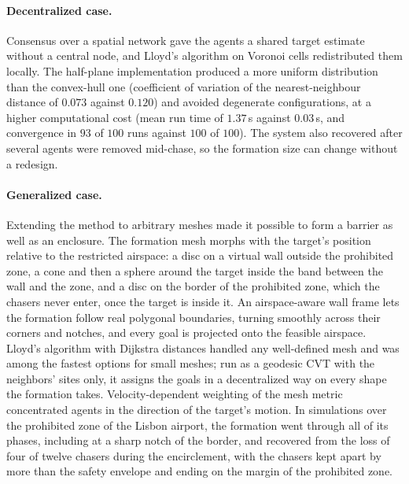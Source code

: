 \paragraph{Decentralized case.} 
Consensus over a spatial network gave the agents a shared target estimate without a central node, and Lloyd's algorithm on Voronoi cells redistributed them locally. The half-plane implementation produced a more uniform distribution than the convex-hull one (coefficient of variation of the nearest-neighbour distance of $0.073$ against $0.120$) and avoided degenerate configurations, at a higher computational cost (mean run time of $1.37$\,s against $0.03$\,s, and convergence in $93$ of $100$ runs against $100$ of $100$). The system also recovered after several agents were removed mid-chase, so the formation size can change without a redesign.

\paragraph{Generalized case.} 
Extending the method to arbitrary meshes made it possible to form a barrier as well as an enclosure. The formation mesh morphs with the target's position relative to the restricted airspace: a disc on a virtual wall outside the prohibited zone, a cone and then a sphere around the target inside the band between the wall and the zone, and a disc on the border of the prohibited zone, which the chasers never enter, once the target is inside it. An airspace-aware wall frame lets the formation follow real polygonal boundaries, turning smoothly across their corners and notches, and every goal is projected onto the feasible airspace. Lloyd's algorithm with Dijkstra distances handled any well-defined mesh and was among the fastest options for small meshes; run as a geodesic \gls{CVT} with the neighbors' sites only, it assigns the goals in a decentralized way on every shape the formation takes. Velocity-dependent weighting of the mesh metric concentrated agents in the direction of the target's motion. In simulations over the prohibited zone of the Lisbon airport, the formation went through all of its phases, including at a sharp notch of the border, and recovered from the loss of four of twelve chasers during the encirclement, with the chasers kept apart by more than the safety envelope and ending on the margin of the prohibited zone.

